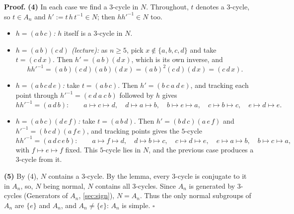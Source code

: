 \documentclass[11pt]{report}
\renewenvironment{proof}[1][Proof]{\noindent\textbf{#1.} }{\hfill$\square$\par\vspace{5pt}}
\begin{document}
\begin{proof}
\textbf{(4)} In each case we find a $3$-cycle in $N$. Throughout, $t$ denotes a $3$-cycle, so $t \in A_n$ and $h' := t\,h\,t^{-1} \in N$; then $hh'^{-1} \in N$ too.
\begin{itemize}
    \item \emph{$h = (a\,b\,c)$:} $h$ itself is a $3$-cycle in $N$.
    \item \emph{$h = (a\,b)(c\,d)$ (lecture):} as $n \geq 5$, pick $x \notin \{a, b, c, d\}$ and take $t = (c\,d\,x)$. Then $h' = (a\,b)(d\,x)$, which is its own inverse, and
    \[ hh'^{-1} = (a\,b)(c\,d)(a\,b)(d\,x) = (a\,b)^2(c\,d)(d\,x) = (c\,d\,x). \]
    \item \emph{$h = (a\,b\,c\,d\,e)$:} take $t = (a\,b\,c)$. Then $h' = (b\ c\ a\ d\ e)$, and tracking each point through $h'^{-1} = (e\ d\ a\ c\ b)$ followed by $h$ gives
    \[ hh'^{-1} = (a\,d\,b): \qquad a \mapsto c \mapsto d,\quad d \mapsto a \mapsto b,\quad b \mapsto e \mapsto a,\quad c \mapsto b \mapsto c,\quad e \mapsto d \mapsto e. \]
    \item \emph{$h = (a\,b\,c)(d\,e\,f)$:} take $t = (a\,b\,d)$. Then $h' = (b\,d\,c)(a\,e\,f)$ and $h'^{-1} = (b\,c\,d)(a\,f\,e)$, and tracking points gives the $5$-cycle
    \[ hh'^{-1} = (a\,d\,c\,e\,b): \qquad a \mapsto f \mapsto d,\quad d \mapsto b \mapsto c,\quad c \mapsto d \mapsto e,\quad e \mapsto a \mapsto b,\quad b \mapsto c \mapsto a, \]
    with $f \mapsto e \mapsto f$ fixed. This $5$-cycle lies in $N$, and the previous case produces a $3$-cycle from it.
\end{itemize}

\textbf{(5)} By (4), $N$ contains a $3$-cycle. By the lemma, every $3$-cycle is conjugate to it in $A_n$, so, $N$ being normal, $N$ contains all $3$-cycles. Since $A_n$ is generated by $3$-cycles (Generators of $A_n$, \ref{sec:sign}), $N = A_n$. Thus the only normal subgroups of $A_n$ are $\{e\}$ and $A_n$, and $A_n \neq \{e\}$: $A_n$ is simple.
\end{proof}
\end{document}
